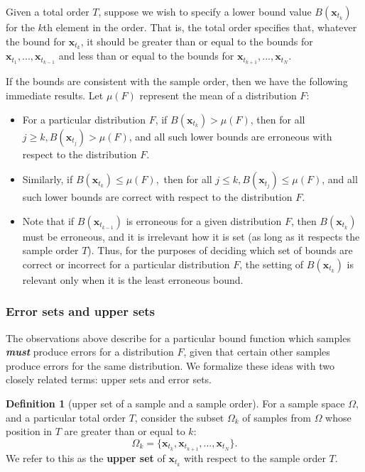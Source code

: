 \documentclass{article}
\theoremstyle{definition}
\newtheorem{definition}{Definition}[section]
\theoremstyle{remark}
\def\x{\mathbf{x}}
\begin{document}
Given a total order $T$, suppose we wish to specify a lower bound value $B(\x_{t_k})$ for the $k$th element in the order. That is, the total order specifies that, whatever the bound for $\x_{t_k}$, it should be greater than or equal to the bounds for $\x_{t_1},...,\x_{t_{k-1}}$ and less than or equal to the bounds for $\x_{t_{k+1}},...,\x_{t_N}$.

If the bounds are consistent with the sample order, then we have the following immediate results. Let $\mu(F)$ represent the mean of a distribution $F$:
\begin{itemize}
    \item For a particular distribution $F$, if $B(\x_{t_k})>\mu(F)$, then for all $j \geq k, B(\x_{t_j})>\mu(F)$, and all such lower bounds are erroneous with respect to the distribution $F$.
    \item Similarly, if $B(\x_{t_k})\leq \mu(F),$ then for all $j \leq k, B(\x_{t_j})\leq \mu(F)$, and all such lower bounds are correct with respect to the distribution $F$.
    \item Note that if $B(\x_{t_{k-1}})$ is erroneous for a given distribution $F$, then $B(\x_{t_k})$ must be erroneous, and it is irrelevant how it is set (as long as it respects the sample order $T$). Thus, for the purposes of deciding which set of bounds are correct or incorrect for a particular distribution $F$, the setting of $B(\x_{t_k})$ is relevant only when it is the least erroneous bound.
\end{itemize}

\subsubsection{Error sets and upper sets}
The observations above describe for a particular bound function which samples {\em \textbf{must}} produce errors for a distribution $F$, given that certain other samples produce errors for the same distribution. We formalize these ideas with two closely related terms: upper sets and error sets.

\begin{definition}[upper set of a sample and a sample order]
\label{def:upper_set}
 For a sample space $\Omega$, and a particular total order $T$, consider the subset $\Omega_k$ of samples from $\Omega$ whose position in $T$ are greater than or equal to $k$:
$$
\Omega_k=\{\x_{t_k},\x_{t_{k+1}}, ..., \x_{t_N}\}.$$
We refer to this as the {\bf upper set} of $\x_{t_k}$ with respect to the sample order $T$. 
\end{definition}
\end{document}
